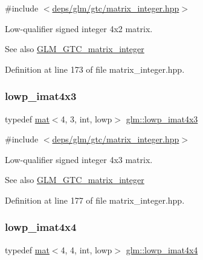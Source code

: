 {\ttfamily \#include $<$\hyperlink{matrix__integer_8hpp}{deps/glm/gtc/matrix\+\_\+integer.\+hpp}$>$}

Low-\/qualifier signed integer 4x2 matrix. \begin{DoxySeeAlso}{See also}
\hyperlink{group__gtc__matrix__integer}{G\+L\+M\+\_\+\+G\+T\+C\+\_\+matrix\+\_\+integer} 
\end{DoxySeeAlso}


Definition at line 173 of file matrix\+\_\+integer.\+hpp.

\mbox{\label{group__gtc__matrix__integer_gad4b823d8b8ba89d8d6baa562ffb97751}} 
\subsubsection{\texorpdfstring{lowp\+\_\+imat4x3}{lowp\_imat4x3}}
{\footnotesize\ttfamily typedef \hyperlink{structglm_1_1mat}{mat}$<$4, 3, int, lowp$>$ \hyperlink{group__gtc__matrix__integer_gad4b823d8b8ba89d8d6baa562ffb97751}{glm\+::lowp\+\_\+imat4x3}}



{\ttfamily \#include $<$\hyperlink{matrix__integer_8hpp}{deps/glm/gtc/matrix\+\_\+integer.\+hpp}$>$}

Low-\/qualifier signed integer 4x3 matrix. \begin{DoxySeeAlso}{See also}
\hyperlink{group__gtc__matrix__integer}{G\+L\+M\+\_\+\+G\+T\+C\+\_\+matrix\+\_\+integer} 
\end{DoxySeeAlso}


Definition at line 177 of file matrix\+\_\+integer.\+hpp.

\mbox{\label{group__gtc__matrix__integer_ga788e6fa0d6ba756ae9fc758099c57f85}} 
\subsubsection{\texorpdfstring{lowp\+\_\+imat4x4}{lowp\_imat4x4}}
{\footnotesize\ttfamily typedef \hyperlink{structglm_1_1mat}{mat}$<$4, 4, int, lowp$>$ \hyperlink{group__gtc__matrix__integer_ga788e6fa0d6ba756ae9fc758099c57f85}{glm\+::lowp\+\_\+imat4x4}}



